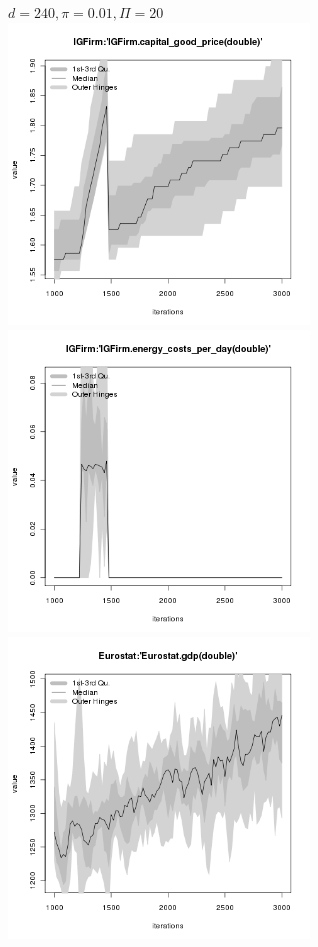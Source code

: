 \begin{figure}[ht!]
\centering\leavevmode
\begin{minipage}{17cm}
\centering\leavevmode
{$d=240, \pi=0.01, \Pi=20$}\\
\includegraphics[width=8cm]{./energy_shock/png/duration_240/intensity_0.01/frequency_20/IGFirm-capital_good_price.png}
\includegraphics[width=8cm]{./energy_shock/png/duration_240/intensity_0.01/frequency_20/IGFirm-energy_costs_per_day.png}
\includegraphics[width=8cm]{./energy_shock/png/duration_240/intensity_0.01/frequency_20/Eurostat-gdp.png}

\end{minipage}
\end{figure}
